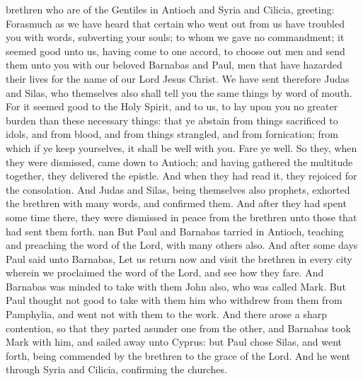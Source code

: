 brethren who are of the Gentiles in Antioch and Syria and Cilicia, greeting: Forasmuch as we have heard that certain who went out from us have troubled you with words, subverting your souls; to whom we gave no commandment; it seemed good unto us, having come to one accord, to choose out men and send them unto you with our beloved Barnabas and Paul, men that have hazarded their lives for the name of our Lord Jesus Christ. We have sent therefore Judas and Silas, who themselves also shall tell you the same things by word of mouth. For it seemed good to the Holy Spirit, and to us, to lay upon you no greater burden than these necessary things: that ye abstain from things sacrificed to idols, and from blood, and from things strangled, and from fornication; from which if ye keep yourselves, it shall be well with you. Fare ye well.  So they, when they were dismissed, came down to Antioch; and having gathered the multitude together, they delivered the epistle. And when they had read it, they rejoiced for the consolation. And Judas and Silas, being themselves also prophets, exhorted the brethren with many words, and confirmed them. And after they had spent some time there, they were dismissed in peace from the brethren unto those that had sent them forth. nan But Paul and Barnabas tarried in Antioch, teaching and preaching the word of the Lord, with many others also.  And after some days Paul said unto Barnabas, Let us return now and visit the brethren in every city wherein we proclaimed the word of the Lord, and see how they fare. And Barnabas was minded to take with them John also, who was called Mark. But Paul thought not good to take with them him who withdrew from them from Pamphylia, and went not with them to the work. And there arose a sharp contention, so that they parted asunder one from the other, and Barnabas took Mark with him, and sailed away unto Cyprus: but Paul chose Silas, and went forth, being commended by the brethren to the grace of the Lord. And he went through Syria and Cilicia, confirming the churches. 

